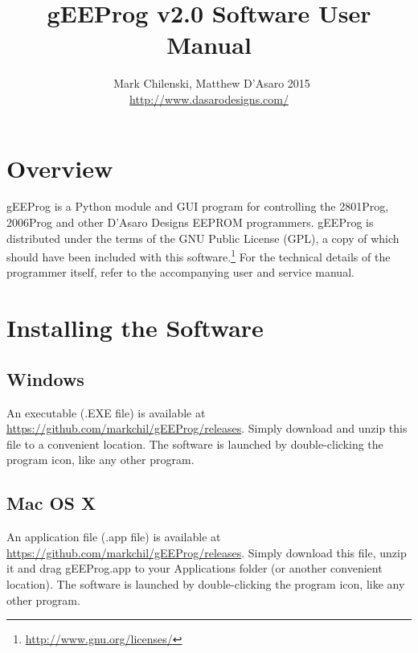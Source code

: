 \documentclass[letter]{article}
\title{gEEProg v2.0 Software User Manual}
\author{\textcopyright\ Mark Chilenski, Matthew D'Asaro 2015\\\url{http://www.dasarodesigns.com/}}
\begin{document}
\maketitle

\section{Overview}
gEEProg is a Python module and GUI program for controlling the 2801Prog, 2006Prog and other D'Asaro Designs EEPROM programmers.
gEEProg is distributed under the terms of the GNU Public License (GPL), a copy of which should have been included with this software.\footnote{\url{http://www.gnu.org/licenses/}}
For the technical details of the programmer itself, refer to the accompanying user and service manual.

\section{Installing the Software}
\subsection{Windows}
An executable (.EXE file) is available at \url{https://github.com/markchil/gEEProg/releases}.
Simply download and unzip this file to a convenient location.
The software is launched by double-clicking the program icon, like any other program.

\subsection{Mac OS X}
An application file (.app file) is available at \url{https://github.com/markchil/gEEProg/releases}.
Simply download this file, unzip it and drag gEEProg.app to your Applications folder (or another convenient location).
The software is launched by double-clicking the program icon, like any other program.
\end{document}

